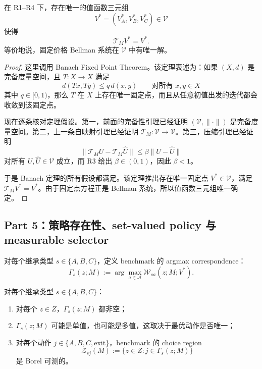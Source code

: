 \begin{theorem}
在 R1--R4 下，存在唯一的值函数三元组
\[
V^*=(V_A^*,V_B^*,V_C^*)\in\mathcal V
\]
使得
\[
\mathcal T_MV^*=V^*.
\]
等价地说，固定价格 Bellman 系统在 $\mathcal V$ 中有唯一解。
\end{theorem}

\begin{proof}
这里调用 Banach Fixed Point Theorem。该定理表述为：如果 $(X,d)$ 是完备度量空间，且 $T:X\to X$ 满足
\[
d(Tx,Ty)\le q\,d(x,y)\qquad\text{对所有 }x,y\in X
\]
其中 $q\in[0,1)$，那么 $T$ 在 $X$ 上存在唯一固定点，而且从任意初值出发的迭代都会收敛到该固定点。

现在逐条核对定理假设。第一，前面的完备性引理已经证明 $(\mathcal V,\|\cdot\|)$ 是完备度量空间。第二，上一条自映射引理已经证明 $\mathcal T_M:\mathcal V\to\mathcal V$。第三，压缩引理已经证明
\[
\|\mathcal T_MU-\mathcal T_M\widehat U\|\le \beta\|U-\widehat U\|
\]
对所有 $U,\widehat U\in\mathcal V$ 成立，而 R3 给出 $\beta\in(0,1)$，因此 $\beta<1$。

于是 Banach 定理的所有假设都满足。该定理推出存在唯一固定点 $V^*\in\mathcal V$，满足 $\mathcal T_MV^*=V^*$。由于固定点方程正是 Bellman 系统，所以值函数三元组唯一确定。
\end{proof}

\subsection{Part 5：策略存在性、set-valued policy 与 measurable selector}

对每个继承类型 $s\in\{A,B,C\}$，定义 benchmark 的 argmax correspondence：
\[
\Gamma_s(z;M):=\arg\max_{a\in\mathcal A}\mathcal W_{sa}(z;M;V^*).
\]

\begin{proposition}
对每个继承类型 $s\in\{A,B,C\}$：
\begin{enumerate}
    \item 对每个 $z\in Z$，$\Gamma_s(z;M)$ 都非空；
    \item $\Gamma_s(z;M)$ 可能是单值，也可能是多值，这取决于最优动作是否唯一；
    \item 对每个动作 $j\in\{A,B,C,\mathrm{exit}\}$，benchmark 的 choice region
    \[
    \mathcal Z_{sj}(M):=\{z\in Z:j\in\Gamma_s(z;M)\}
    \]
    是 Borel 可测的。
\end{enumerate}
\end{proposition}

